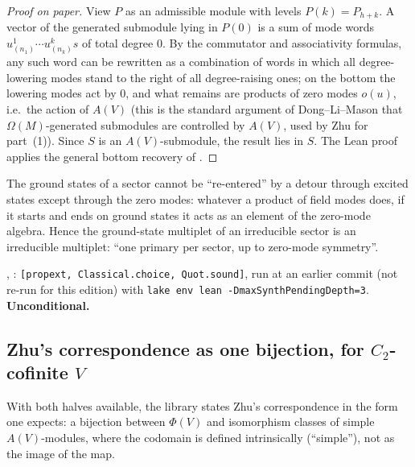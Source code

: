 \begin{proof}[Proof on paper]
View $P$ as an admissible module with levels $P(k)=P_{h+k}$. A vector of the generated submodule lying in $P(0)$ is a sum of
mode words $u^1_{(n_1)}\cdots u^k_{(n_k)}s$ of total degree $0$. By the commutator and associativity formulas, any such word
can be rewritten as a combination of words in which all degree-lowering modes stand to the right of all degree-raising
ones; on the bottom the lowering modes act by $0$, and what remains are products of zero modes $o(u)$, i.e.\ the action of
$A(V)$ (this is the standard argument of Dong--Li--Mason that $\Omega(M)$-generated submodules are controlled by
$A(V)$, used by Zhu for part~(1)). Since $S$ is an $A(V)$-submodule, the result lies in $S$. The Lean proof applies the
general bottom recovery of .
\end{proof}

\begin{physics}
The ground states of a sector cannot be ``re-entered'' by a detour through excited states except through the zero modes:
whatever a product of field modes does, if it starts and ends on ground states it acts as an element of the zero-mode
algebra. Hence the ground-state multiplet of an irreducible sector is an irreducible multiplet: ``one primary per sector,
up to zero-mode symmetry''.
\end{physics}

\begin{status}
, :
\texttt{[propext, Classical.choice, Quot.sound]}, run at an earlier commit (not re-run for this edition) with \texttt{lake env lean -DmaxSynthPendingDepth=3}.
\textbf{Unconditional.}
\end{status}

\subsection{Zhu's correspondence as one bijection, for \texorpdfstring{$C_2$}{C2}-cofinite \texorpdfstring{$V$}{V}}\label{l13:sec:zhucorr}

With both halves available, the library states Zhu's correspondence in the form one expects: a bijection between $\Phi(V)$
and isomorphism classes of simple $A(V)$-modules, where the codomain is defined intrinsically (``simple''), not as the image of
the map.

